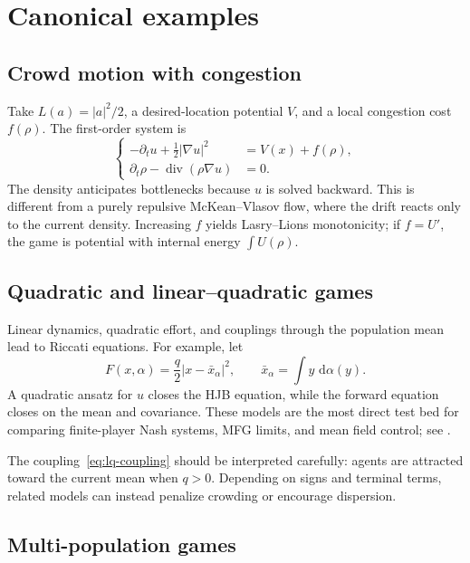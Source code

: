 \documentclass[11pt,a4paper]{article}
\theoremstyle{definition}
\newcommand{\diverg}{\operatorname{div}}
\newcommand{\dd}{\,\mathrm d}
\newcommand{\abs}[1]{\left\lvert#1\right\rvert}
\newcommand{\al}{\alpha}
\begin{document}
\section{Canonical examples}

\subsection{Crowd motion with congestion}

Take $L(a)=\abs a^2/2$, a desired-location potential $V$, and a local
congestion cost $f(\rho)$.  The first-order system is
\begin{equation}\label{eq:mfg-crowd}
\left\{
\begin{aligned}
 -\partial_tu+\tfrac12\abs{\nabla u}^2&=V(x)+f(\rho),\\
 \partial_t\rho-\diverg(\rho\nabla u)&=0.
\end{aligned}
\right.
\end{equation}
The density anticipates bottlenecks because $u$ is solved backward.  This is
different from a purely repulsive McKean--Vlasov flow, where the drift reacts
only to the current density.  Increasing $f$ yields Lasry--Lions monotonicity;
if $f=U'$, the game is potential with internal energy $\int U(\rho)$.

\subsection{Quadratic and linear--quadratic games}

Linear dynamics, quadratic effort, and couplings through the population mean
lead to Riccati equations.  For example, let
\begin{equation}\label{eq:lq-coupling}
  F(x,\al)=\frac q2\abs{x-\bar x_\al}^2,
  \qquad
  \bar x_\al=\int y\,\dd\al(y).
\end{equation}
A quadratic ansatz for $u$ closes the HJB equation, while the forward
equation closes on the mean and covariance.  These models are the most direct
test bed for comparing finite-player Nash systems, MFG limits, and mean field
control; see \citet{HuangMalhameCaines2006,BensoussanFrehseYam2013}.

The coupling~\eqref{eq:lq-coupling} should be interpreted carefully: agents
are attracted toward the current mean when $q>0$.  Depending on signs and
terminal terms, related models can instead penalize crowding or encourage
dispersion.

\subsection{Multi-population games}
\end{document}

